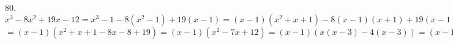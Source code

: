 80. $x^3-8x^2+19x-12=x^3-1-8(x^2-1)+19(x-1)=(x-1)(x^2+x+1)-8(x-1)(x+1)+19(x-1)=$\\$=(x-1)(x^2+x+1-8x-8+19)=
(x-1)(x^2-7x+12)=(x-1)(x(x-3)-4(x-3))=(x-1)(x-3)(x-4).$\\
